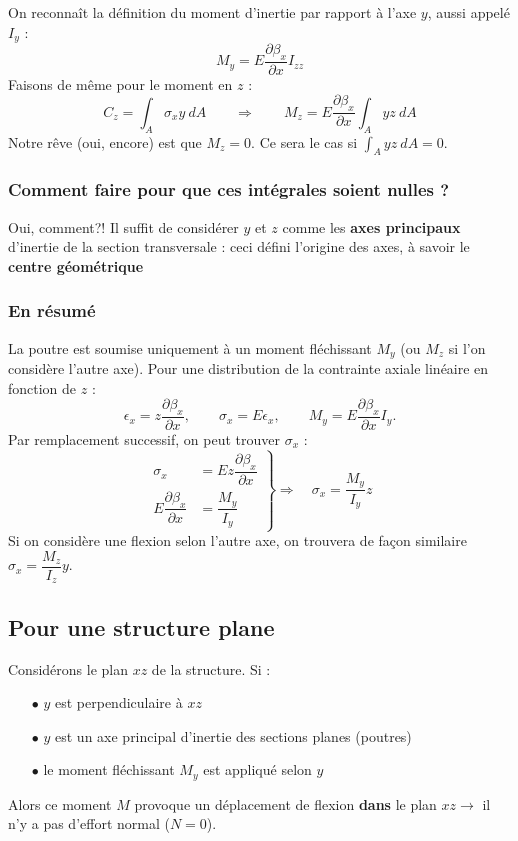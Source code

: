 	On reconnaît la définition du moment d’inertie par rapport à l'axe 
	$y$, aussi appelé $I_y$ :
	\begin{equation}
	M_y = E\dfrac{\partial\beta_x}{\partial x}I_{zz}
	\end{equation}
	Faisons de même pour le moment en $z$ :
	\begin{equation}
	C_z = \int_A \sigma_xy\ dA\qquad\Longrightarrow\qquad M_z = E\dfrac{
	\partial \beta_x}{\partial x}\int_Ayz\ dA
	\end{equation}	
	Notre rêve (oui, encore) est que $M_z=0$. Ce sera le cas si $\int_A 
	yz\ dA = 0$.\\
	
		\subsubsection{Comment faire pour que ces intégrales soient nulles ?}
		Oui, comment?! Il suffit de considérer $y$ et $z$ comme les 
		\textbf{axes principaux} d’inertie de la section transversale : ceci 
		défini l’origine des axes, à savoir le \textbf{centre géométrique}
		
		\subsubsection{En résumé}
		La poutre est soumise uniquement à un moment fléchissant $M_y$ (ou 
		$M_z$ si l'on considère l'autre axe).
		Pour une distribution de la contrainte axiale linéaire en fonction 
		de $z$ :
		\begin{equation}
		\epsilon_x = z\dfrac{\partial \beta_x}{\partial x},\qquad \sigma_x 
		= E\epsilon_x,\qquad M_y = E\dfrac{\partial \beta_x}{\partial x}I_y.
		\end{equation}
		Par remplacement successif, on peut trouver $\sigma_x$ :
		\begin{equation}
		\left.\begin{array}{ll}
		\sigma_x &= Ez\dfrac{\partial \beta_x}{\partial x}\\
		E\dfrac{\partial\beta_x}{\partial x} &= \dfrac{M_y}{I_y}
		\end{array}\right\}\Longrightarrow\quad \sigma_x = \dfrac{M_y}{I_y}z
		\end{equation}
		Si on considère une flexion selon l'autre axe, on trouvera de 
		façon similaire $\sigma_x = \dfrac{M_z}{I_z}y$.
		
	\subsection{Pour une structure plane}
	Considérons le plan $xz$ de la structure. Si :
	\begin{itemize}
	\item[$\bullet$] $y$ est perpendiculaire à $xz$
	\item[$\bullet$] $y$ est un axe principal d'inertie des sections planes 
	(poutres)
	\item[$\bullet$] le moment fléchissant $M_y$ est appliqué selon $y$
	\end{itemize}		
	Alors ce moment $M$ provoque un déplacement de flexion \textbf{dans} le 
	plan $xz \longrightarrow$ il n'y a pas d'effort normal ($N=0$).
	
